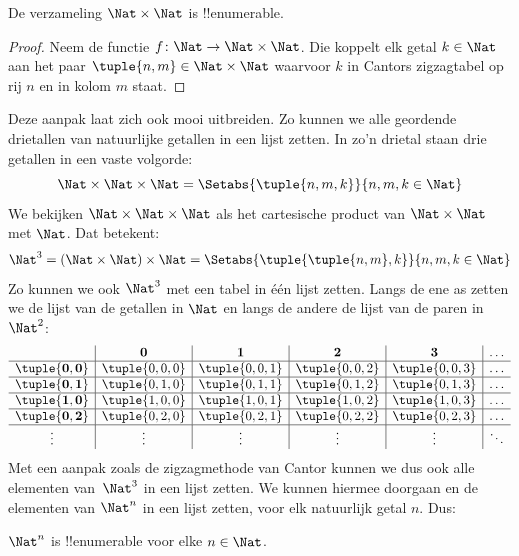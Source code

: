 \documentclass[openany]{memoir}
\begin{document}
\begin{prop}
De verzameling $\Nat \times \Nat$ is !!{enumerable}.
\end{prop}

\begin{proof}
Neem de functie $f \colon \Nat \to \Nat\times\Nat$. Die koppelt elk getal
$k \in \Nat$ aan het paar $\tuple{n,m} \in \Nat \times \Nat$ waarvoor $k$ in
Cantors zigzagtabel op rij $n$ en in kolom $m$ staat. 
\end{proof}

\begin{explain}
Deze aanpak laat zich ook mooi uitbreiden. Zo kunnen we alle geordende
drietallen van natuurlijke getallen in een lijst zetten. In zo'n drietal staan
drie getallen in een vaste volgorde:
\[
\Nat \times \Nat \times \Nat = \Setabs{\tuple{n,m,k}}{n,m,k \in \Nat}
\]
We bekijken $\Nat \times \Nat \times \Nat$ als het cartesische product van
$\Nat \times \Nat$ met $\Nat$. Dat betekent:
\[
\Nat^3 = (\Nat \times \Nat) \times \Nat =
\Setabs{\tuple{\tuple{n,m},k}}{n, m, k
  \in \Nat }
\]
Zo kunnen we ook $\Nat^3$ met een tabel in één lijst zetten. Langs de ene as
zetten we de lijst van de getallen in $\Nat$ en langs de andere de lijst van de
paren in $\Nat^2$:
\[
\begin{array}{ c | c | c | c | c | c}
& \mathbf 0 & \mathbf 1 & \mathbf 2 & \mathbf 3 & \dots \\
\hline
\mathbf{\tuple{0,0}} & \tuple{0,0,0} & \tuple{0,0,1} & \tuple{0,0,2} & \tuple{0,0,3} & \dots \\
\hline
\mathbf{\tuple{0,1}} & \tuple{0,1,0} & \tuple{0,1,1} & \tuple{0,1,2} & \tuple{0,1,3} & \dots \\
\hline
\mathbf{\tuple{1,0}} & \tuple{1,0,0} & \tuple{1,0,1} & \tuple{1,0,2} & \tuple{1,0,3} & \dots \\
\hline
\mathbf{\tuple{0,2}} & \tuple{0,2,0} & \tuple{0,2,1} & \tuple{0,2,2} & \tuple{0,2,3} & \dots\\
\hline
\vdots & \vdots & \vdots & \vdots & \vdots & \ddots \\
\end{array}
\]
Met een aanpak zoals de zigzagmethode van Cantor kunnen we dus ook alle
elementen van~$\Nat^3$ in een lijst zetten. We kunnen hiermee doorgaan en de
elementen van $\Nat^n$ in een lijst zetten, voor elk natuurlijk getal $n$.
Dus:
\end{explain}

\begin{prop}
$\Nat^n$ is !!{enumerable} voor elke $n \in \Nat$.
\end{prop}
\end{document}
